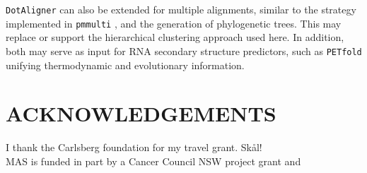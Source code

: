 \documentclass[a4paper,twoside]{article}
\newcommand\dotaligner{\texttt{DotAligner}}
\newcommand\pmmulti{\texttt{pmmulti}}
\newcommand\petfold{\texttt{PETfold}}
\begin{document}
\dotaligner{} can also be extended for multiple alignments, similar to the strategy
implemented in \pmmulti{} \cite{Hofacker15073017}, and the generation of
phylogenetic trees. This may replace or support the hierarchical clustering
approach used here. In addition, both may serve as input for RNA secondary
structure predictors, such as \petfold{} \cite{Seemann2008} unifying
thermodynamic and evolutionary information. 


\section*{\uppercase{Acknowledgements}}

\noindent I thank the Carlsberg foundation for my travel grant. Sk\aa l! \\
MAS is funded in part by a Cancer Council NSW project grant and 



\vfill

{\small
}


\vfill
\end{document}
